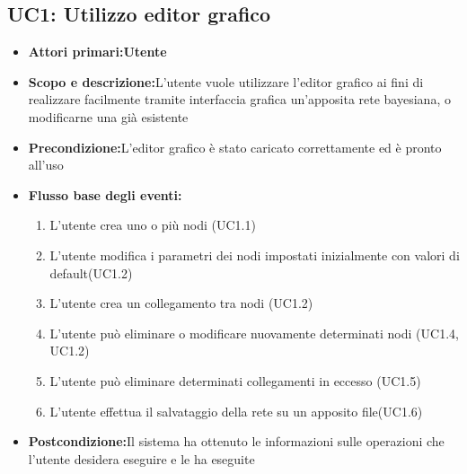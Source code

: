 \subsection{UC1: Utilizzo editor grafico}
\begin{itemize}
	\item{\textbf{Attori primari:Utente}}
	\item{\textbf{Scopo e descrizione:}L'utente vuole utilizzare l'editor grafico ai fini di realizzare facilmente tramite interfaccia grafica un'apposita rete bayesiana, o modificarne una già esistente}
	\item{\textbf{Precondizione:}L'editor grafico è stato caricato correttamente ed è pronto all'uso}
	\item{\textbf{Flusso base degli eventi:}
		\begin{enumerate}
			\item{L'utente crea uno o più nodi (UC1.1)}
			\item{L'utente modifica i parametri dei nodi impostati inizialmente con valori di default(UC1.2)}
			\item{L'utente crea un collegamento tra nodi (UC1.2)}
			\item{L'utente può eliminare o modificare nuovamente determinati nodi (UC1.4, UC1.2)}
			\item{L'utente può eliminare determinati collegamenti in eccesso (UC1.5)}
			\item{L'utente effettua il salvataggio della rete su un apposito file(UC1.6)}
		\end{enumerate}
	}
	\item{\textbf{Postcondizione:}Il sistema ha ottenuto le informazioni sulle operazioni che l'utente desidera eseguire e le ha eseguite}
\end{itemize}
